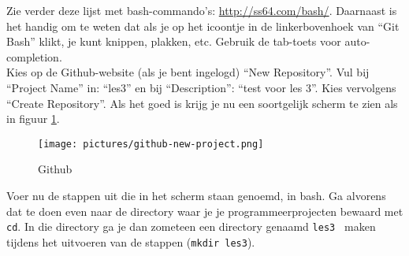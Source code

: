 Zie verder deze lijst met bash-commando's: \url{http://ss64.com/bash/}.
Daarnaast is het handig om te weten dat als je op het icoontje in de
linkerbovenhoek van ``Git Bash'' klikt, je kunt knippen, plakken, etc.
Gebruik de tab-toets voor auto-completion.\\



\step Kies op de Github-website (als je bent ingelogd) ``New Repository''. Vul bij ``Project Name'' in: ``les3''
en bij ``Description'': ``test voor les 3''. Kies vervolgens ``Create
Repository''. Als het goed is krijg je nu een soortgelijk scherm te
zien als in figuur \ref{fig:github-new}. \\

\begin{figure} 
  \caption{Github}
  \texttt{[image: pictures/github-new-project.png]}
  \label{fig:github-new}
\end{figure}

\step Voer nu de stappen uit die in het scherm staan genoemd, in bash. Ga alvorens dat te doen even naar de directory waar je je
programmeerprojecten bewaard met {\tt cd}. In die directory ga je dan zometeen een
directory genaamd {\tt les3 } maken tijdens het uitvoeren van de
stappen ({\tt mkdir les3}). \\

